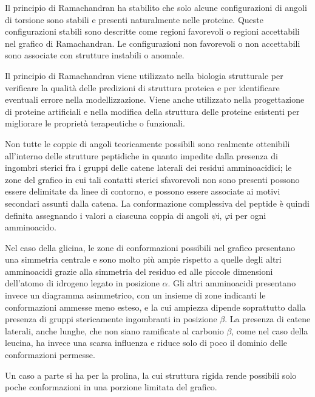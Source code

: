 Il principio di Ramachandran ha stabilito che solo alcune configurazioni di angoli di torsione sono stabili e presenti naturalmente nelle proteine. 
Queste configurazioni stabili sono descritte come regioni favorevoli o regioni accettabili nel grafico di Ramachandran. Le configurazioni non favorevoli o 
non accettabili sono associate con strutture instabili o anomale.

Il principio di Ramachandran viene utilizzato nella biologia strutturale per verificare la qualità delle predizioni di struttura proteica e per identificare 
eventuali errore nella modellizzazione. Viene anche utilizzato nella progettazione di proteine artificiali e nella modifica della struttura delle proteine 
esistenti per migliorare le proprietà terapeutiche o funzionali.

Non tutte le coppie di angoli teoricamente possibili sono realmente ottenibili all'interno delle strutture peptidiche in quanto impedite dalla presenza di 
ingombri sterici fra i gruppi delle catene laterali dei residui amminoacidici; le zone del grafico in cui tali contatti sterici sfavorevoli non sono presenti 
possono essere delimitate da linee di contorno, e possono essere associate ai motivi secondari assunti dalla catena. La conformazione complessiva del peptide 
è quindi definita assegnando i valori a ciascuna coppia di angoli $\psi$i, $\varphi$i per ogni amminoacido.

Nel caso della glicina, le zone di conformazioni possibili nel grafico presentano una simmetria centrale e sono molto più ampie rispetto a quelle degli 
altri amminoacidi grazie alla simmetria del residuo ed alle piccole dimensioni dell'atomo di idrogeno legato in posizione $\alpha$. Gli altri amminoacidi presentano 
invece un diagramma asimmetrico, con un insieme di zone indicanti le conformazioni ammesse meno esteso, e la cui ampiezza dipende soprattutto dalla presenza 
di gruppi stericamente ingombranti in posizione $\beta$. La presenza di catene laterali, anche lunghe, che non siano ramificate al carbonio $\beta$, come nel caso della 
leucina, ha invece una scarsa influenza e riduce solo di poco il dominio delle conformazioni permesse.

Un caso a parte si ha per la prolina, la cui struttura rigida rende possibili solo poche conformazioni in una porzione limitata del grafico.

